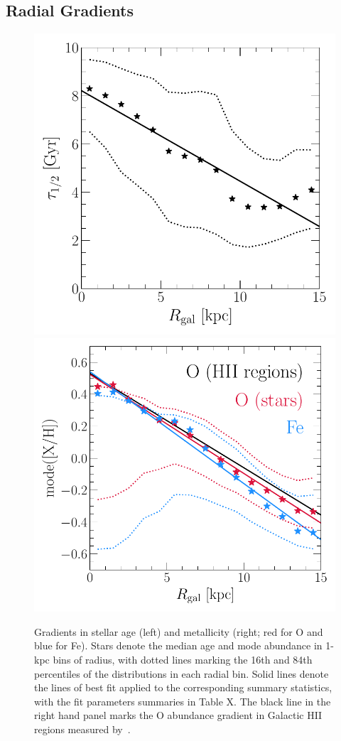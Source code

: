 \subsection{Radial Gradients}
\label{outflows:sec:empirical:gradients}

\begin{figure}
\centering
\includegraphics[scale = 0.51]{age_gradient.pdf}
\includegraphics[scale = 0.5]{gradxh.pdf}
\caption{
Gradients in stellar age (left) and metallicity (right; red for O and blue for
Fe).
Stars denote the median age and mode abundance in 1-kpc bins of radius, with
dotted lines marking the 16th and 84th percentiles of the distributions in each
radial bin.
Solid lines denote the lines of best fit applied to the corresponding summary
statistics, with the fit parameters summaries in Table X.
The black line in the right hand panel marks the O abundance gradient in
Galactic HII regions measured by~\citet{MendezDelgado2022}.
}
\label{outflows:fig:gradxh-gradage}
\end{figure}
